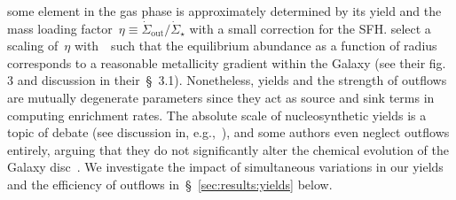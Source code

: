 \documentclass[ms.tex]{subfiles}
\begin{document}
some element in the gas phase is approximately determined by its yield and the
mass loading factor~$\eta \equiv \dot{\Sigma}_\text{out} / \dot{\Sigma}_\star$
with a small correction for the SFH.
\citet{Johnson2021} select a scaling of~$\eta$ with~\rgal~such that the
equilibrium abundance as a function of radius corresponds to a reasonable
metallicity gradient within the Galaxy (see their fig. 3 and discussion in
their~\S~3.1).
Nonetheless, yields and the strength of outflows are mutually degenerate
parameters since they act as source and sink terms in computing enrichment
rates.
The absolute scale of nucleosynthetic yields is a topic of debate (see
discussion in, e.g.,~\citealp{Griffith2021a}), and some authors even neglect
outflows entirely, arguing that they do not significantly alter the chemical
evolution of the Galaxy disc~\citep[e.g.][]{Spitoni2019, Spitoni2021}.
We investigate the impact of simultaneous variations in our yields and the
efficiency of outflows in~\S~\ref{sec:results:yields} below.
\end{document}
